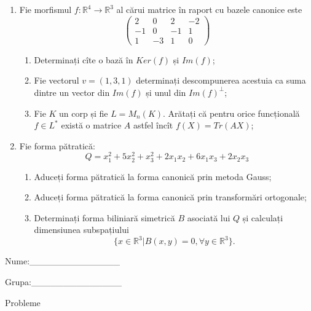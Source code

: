\documentclass{article}
\begin{document}
\begin{enumerate}
 \item Fie morfismul $f:\mathbb{R}^4 \to \mathbb{R}^3$ al cărui matrice în raport cu bazele canonice este
$$\begin{pmatrix}
2&0&2&-2\\
-1&0&-1&1\\
1&-3&1&0
\end{pmatrix}$$

\begin{enumerate}
\item Determinați cîte o bază în $Ker(f)$ și $Im(f)$;
\item Fie vectorul $v=(1,3,1)$ determinați descompunerea acestuia ca suma dintre un vector din $Im(f)$ și unul din $Im(f)^\perp$;
\item Fie $K$ un corp și fie $L=M_n(K)$. Arătați că pentru orice funcțională $f \in L^*$ există o matrice $A$ astfel încît $f(X)=Tr(AX)$;
\end{enumerate}
\item Fie forma pătratică:
$$Q= x_1^2+5x_2^2+x_3^2+2x_1x_2+6x_1x_3+2x_2x_3$$

\begin{enumerate}
\item Aduceți forma pătratică la forma canonică prin metoda Gauss;
\item Aduceți forma pătratică la forma canonică prin transformări ortogonale;
\item Determinați forma biliniară simetrică $B$ asociată lui $Q$ și calculați dimensiunea subspațiului
$$\{x \in \mathbb{R}^3 | B(x,y)=0,\forall y \in \mathbb{R}^3\}.$$

\end{enumerate}
\end{enumerate}
\newpage
\begin{flushright}
Nume:\_\_\_\_\_\_\_\_\_\_\_\_\_\_
 
 
Grupa:\_\_\_\_\_\_\_\_\_\_\_\_\_\_
\end{flushright}
\begin{center}
\vspace{2cm}
{\Large Probleme}
\vspace{2cm}
\end{center}
\end{document}
